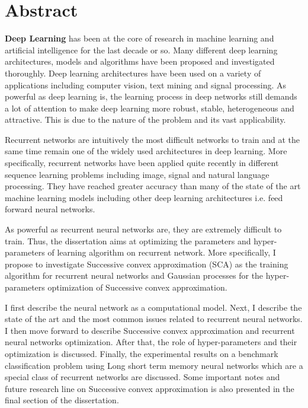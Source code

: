 \documentclass[12pt]{report}
\begin{document}
\chapter*{Abstract}

\textbf{Deep Learning} has been at the core of research in machine learning and artificial intelligence for the last decade or so. Many different deep learning architectures, models and algorithms have been proposed and investigated thoroughly. Deep learning architectures have been used on a variety of applications including computer vision, text mining and signal processing. As powerful as deep learning is, the learning process in deep networks still demands a lot of attention to make deep learning more robust, stable, heterogeneous and attractive. This is due to the nature of the problem and its vast applicability.

Recurrent networks are intuitively the most difficult networks to train and at the same time remain one of the widely used architectures in deep learning. More specifically, recurrent networks have been applied quite recently in different sequence learning problems including image, signal and natural language processing. They have reached greater accuracy than many of the state of the art machine learning models including other deep learning architectures i.e. feed forward neural networks. 

As powerful as recurrent neural networks are, they are extremely difficult to train. Thus, the dissertation aims at optimizing the parameters and hyper-parameters of learning algorithm on recurrent network. More specifically, I propose to investigate Successive convex approximation (SCA) as the training algorithm for recurrent neural networks and Gaussian processes for the hyper-parameters optimization of Successive convex approximation. 

I first describe the neural network as a computational model. Next, I describe the state of the art and the most common issues related to recurrent neural networks. I then move forward to describe Successive convex approximation and recurrent neural networks optimization. After that, the role of hyper-parameters and their optimization is discussed. Finally, the experimental results on a benchmark classification problem using Long short term memory neural networks  which are a special class of recurrent networks are discussed. Some important notes and future research line on Successive convex approximation is also presented in the final section of the dissertation. 
\end{document}
